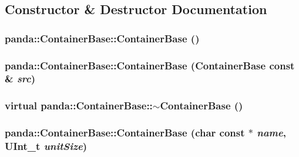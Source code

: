 \subsection{Constructor \& Destructor Documentation}
\hypertarget{classpanda_1_1ContainerBase_a9de9e1e291c477a7ee786ce5b8ba55a9}{
\subsubsection[{ContainerBase}]{\setlength{\rightskip}{0pt plus 5cm}panda::ContainerBase::ContainerBase ()}}
\label{classpanda_1_1ContainerBase_a9de9e1e291c477a7ee786ce5b8ba55a9}
\hypertarget{classpanda_1_1ContainerBase_a5870d70160f2b3ffebf1f2e215d8e8ab}{
\subsubsection[{ContainerBase}]{\setlength{\rightskip}{0pt plus 5cm}panda::ContainerBase::ContainerBase ({\bf ContainerBase} const \& {\em src})}}
\label{classpanda_1_1ContainerBase_a5870d70160f2b3ffebf1f2e215d8e8ab}
\hypertarget{classpanda_1_1ContainerBase_a189c00e40c4146e922578ce665396466}{
\subsubsection[{$\sim$ContainerBase}]{\setlength{\rightskip}{0pt plus 5cm}virtual panda::ContainerBase::$\sim$ContainerBase ()}}
\label{classpanda_1_1ContainerBase_a189c00e40c4146e922578ce665396466}
\hypertarget{classpanda_1_1ContainerBase_a1a538f1858b53bbe6af3918c1c1e10ef}{
\subsubsection[{ContainerBase}]{\setlength{\rightskip}{0pt plus 5cm}panda::ContainerBase::ContainerBase (char const $\ast$ {\em name}, \/  UInt\_\-t {\em unitSize})}}
\label{classpanda_1_1ContainerBase_a1a538f1858b53bbe6af3918c1c1e10ef}


